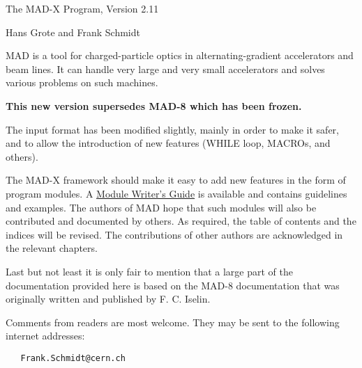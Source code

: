 \label{module_doc}

\begin{center}
\centerline{The MAD-X Program, Version 2.11}  
Hans Grote and Frank Schmidt 
\end{center}

MAD is a tool for charged-particle optics in alternating-gradient
accelerators and beam lines. It can handle very large and very small
accelerators and solves various problems on such machines.  

\textbf{{ This new version supersedes MAD-8 which has been frozen.}}

The input format has been modified slightly, mainly in order to make it
safer, and to allow the introduction of new features (WHILE loop,
MACROs, and others).  

The MAD-X framework should make it easy to add new features in the form
of program modules. A \href{module_doc.html}{ Module Writer's Guide} is
available and contains guidelines and examples. The authors of MAD hope
that such modules will also be contributed and documented by others. As
required, the table of contents and the indices will be revised. The
contributions of other authors are acknowledged in the relevant
chapters.  

Last but not least it is only fair to mention that a large part of the
documentation provided here is based on the MAD-8 documentation that was
originally written and published by F. C. Iselin.  

Comments from readers are most welcome. They may be sent to the following internet addresses: 
\begin{verbatim}
   Frank.Schmidt@cern.ch
\end{verbatim}


